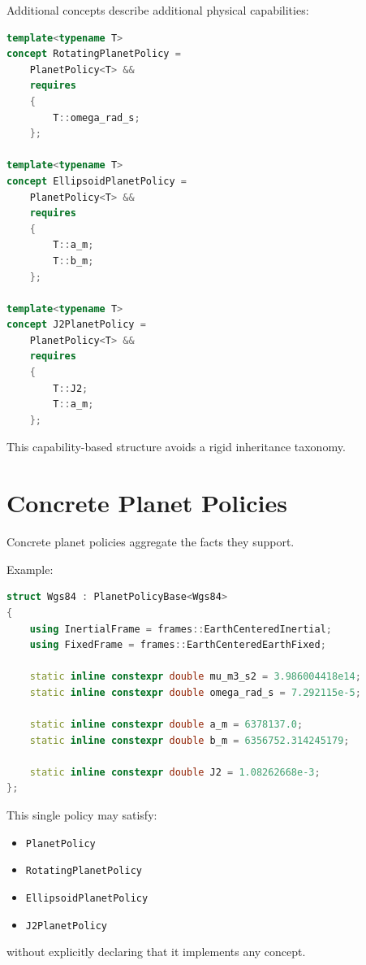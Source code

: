\documentclass[11pt]{article}
\begin{document}
Additional concepts describe additional physical capabilities:

\begin{lstlisting}[language=C++]
template<typename T>
concept RotatingPlanetPolicy =
    PlanetPolicy<T> &&
    requires
    {
        T::omega_rad_s;
    };

template<typename T>
concept EllipsoidPlanetPolicy =
    PlanetPolicy<T> &&
    requires
    {
        T::a_m;
        T::b_m;
    };

template<typename T>
concept J2PlanetPolicy =
    PlanetPolicy<T> &&
    requires
    {
        T::J2;
        T::a_m;
    };
\end{lstlisting}

This capability-based structure avoids a rigid inheritance taxonomy.

\section{Concrete Planet Policies}

Concrete planet policies aggregate the facts they support.

Example:

\begin{lstlisting}[language=C++]
struct Wgs84 : PlanetPolicyBase<Wgs84>
{
    using InertialFrame = frames::EarthCenteredInertial;
    using FixedFrame = frames::EarthCenteredEarthFixed;

    static inline constexpr double mu_m3_s2 = 3.986004418e14;
    static inline constexpr double omega_rad_s = 7.292115e-5;

    static inline constexpr double a_m = 6378137.0;
    static inline constexpr double b_m = 6356752.314245179;

    static inline constexpr double J2 = 1.08262668e-3;
};
\end{lstlisting}

This single policy may satisfy:

\begin{itemize}
    \item \texttt{PlanetPolicy}
    \item \texttt{RotatingPlanetPolicy}
    \item \texttt{EllipsoidPlanetPolicy}
    \item \texttt{J2PlanetPolicy}
\end{itemize}

without explicitly declaring that it implements any concept.
\end{document}
